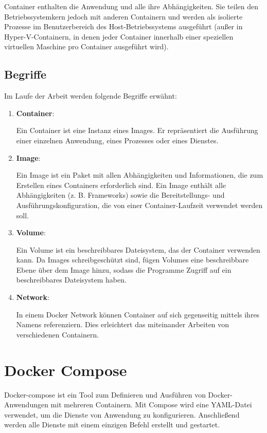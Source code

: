 Container enthalten die Anwendung und alle ihre Abhängigkeiten. Sie teilen den Betriebssystemkern jedoch mit anderen Containern und werden als isolierte Prozesse im Benutzerbereich des Host-Betriebssystems ausgeführt (außer in Hyper-V-Containern, in denen jeder Container innerhalb einer speziellen virtuellen Maschine pro Container ausgeführt wird). \cite{docker}

\subsection{Begriffe}\label{docker-terminology}

Im Laufe der Arbeit werden folgende Begriffe erwähnt:

\begin{enumerate}
    \item \textbf{Container}:
    
    Ein Container ist eine Instanz eines Images. Er repräsentiert die Ausführung einer einzelnen Anwendung, eines Prozesses oder eines Dienstes. 

    \item \textbf{Image}:
    
    Ein Image ist ein Paket mit allen Abhängigkeiten und Informationen, die zum Erstellen eines Containers erforderlich sind. Ein Image enthält alle Abhängigkeiten (z. B. Frameworks) sowie die Bereitstellungs- und Ausführungskonfiguration, die von einer Container-Laufzeit verwendet werden soll. 

    \item \textbf{Volume}:
    
    Ein Volume ist ein beschreibbares Dateisystem, das der Container verwenden kann. Da Images schreibgeschützt sind, fügen Volumes eine beschreibbare Ebene über dem Image hinzu, sodass die Programme Zugriff auf ein beschreibbares Dateisystem haben. 

    \item \textbf{Network}:

    In einem Docker Network können Container auf sich gegenseitig mittels ihres Namens referenziern. Dies erleichtert das miteinander Arbeiten von verschiedenen Containern.
\end{enumerate}

\section{Docker Compose}\label{sec:docker-compose}

Docker-compose ist ein Tool zum Definieren und Ausführen von Docker-Anwendungen mit mehreren Containern. Mit Compose wird eine YAML-Datei verwendet, um die Dienste von Anwendung zu konfigurieren. Anschließend werden alle Dienste mit einem einzigen Befehl erstellt und gestartet. \cite{docker_compose_description}

